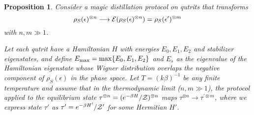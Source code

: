\documentclass[
twocolumn,
superscriptaddress
]{revtex4-1}
\newtheorem{proposition}[theorem]{Proposition}
\def\Z{{\cal Z}}
\def\E{{\cal E}}
\begin{document}
\begin{proposition}\label{prop:no-processing}
	Consider a magic distillation protocol on qutrits that transforms
\begin{equation*}
	\rho_S(\epsilon)^{\otimes n} \longrightarrow \E(\rho_S(\epsilon)^{\otimes n})=\rho_S(\epsilon')^{\otimes m} 
\end{equation*}
with $n, m \gg 1$.

Let each qutrit have a Hamiltonian $H$ with energies $E_0, E_1, E_2$ and stabilizer eigenstates, and define $E_{\rm max} = \max\{E_0, E_1, E_2\}$ and $E_s$ as the eigenvalue of the Hamiltonian eigenstate whose Wigner distribution overlaps the negative component of $\rho_S(\epsilon)$ in the phase space.
Let $T =(k\beta)^{-1}$ be any finite temperature and assume that in the thermodynamic limit ($n,m \gg 1$), the protocol applied to the equilibrium state $\tau^{\otimes n} = (e^{-\beta H}/\Z)^{\otimes n}$ maps $\tau^{\otimes n} \longrightarrow \tau^{\prime \otimes m}$, where we express state $\tau'$ as $\tau' = e^{-\beta H'}/\Z'$ for some Hermitian $H'$.


\end{proposition}
\end{document}
